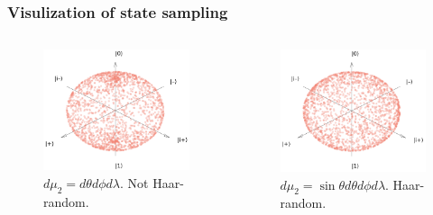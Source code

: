 \documentclass{beamer}
\begin{document}
\begin{frame}
  \frametitle{Visulization of state sampling}
  \begin{columns}
    \begin{column}{0.5\textwidth}
      \begin{figure}
        \centering 
        \includegraphics[scale=0.18]{bloch_not_haar.png}
        \caption{$d\mu_2=d\theta d\phi d\lambda$. Not Haar-random.}
      \end{figure}
    \end{column}
    \begin{column}{0.5\textwidth}
      \begin{figure}
        \centering 
        \includegraphics[scale=0.18]{bloch_haar.png}
        \caption{$d\mu_2=\sin\theta d\theta d\phi d\lambda$. Haar-random.}
      \end{figure}
    \end{column}
  \end{columns}
\end{frame}
\end{document}
